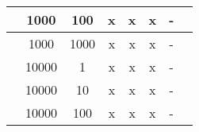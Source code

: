 \begin{table}[h]
\begin{tabular}{|c|c|c|c|c|c|c|l|}
                   & 1000               & 100              & x            & x             & x            & -                 &                                                                                        \\ \hline
                   & 1000               & 1000             & x            & x             & x            & -                 &                                                                                        \\ \hline
                   & 10000              & 1                & x            & x             & x            & -                 &                                                                                        \\ \hline
                   & 10000              & 10               & x            & x             & x            & -                 &                                                                                        \\ \hline
                   & 10000              & 100              & x            & x             & x            & -                 &                                                                                        \\ \hline
\end{tabular}
\end{table}

